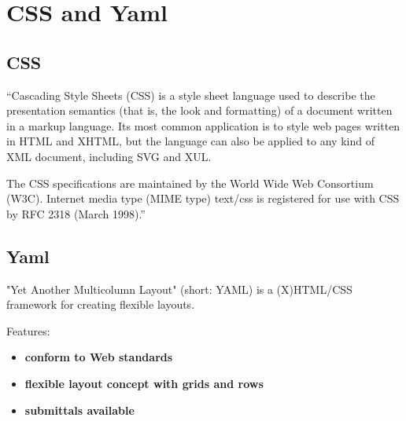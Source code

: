 \section{CSS and Yaml}
\subsection{CSS}
``Cascading Style Sheets (CSS) is a style sheet language used to describe the presentation semantics (that is, the look and formatting) of a document written in a markup language. Its most common application is to style web pages  written in HTML  and XHTML, but the language can also be applied to any kind of XML document, including SVG and XUL.

The CSS specifications are maintained by the World Wide Web Consortium (W3C). Internet media type (MIME type) text/css is registered for use with CSS by RFC 2318 (March 1998).''\cite{wikipedia.org:css}


\subsection{Yaml}
"Yet Another Multicolumn Layout" (short: YAML) is a (X)HTML/CSS framework for creating flexible layouts.

Features:
\begin{itemize}
    \item \textbf{conform to Web standards}
    \item \textbf{flexible layout concept with grids and rows}
    \item \textbf{submittals available}
\end{itemize}
